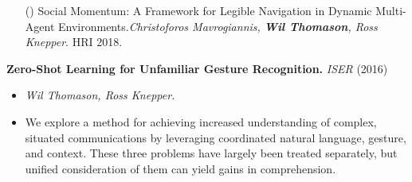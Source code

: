 \documentclass[10pt]{article}
\makeatletter
\newenvironment{innerlist}[1][\enskip\textbullet]%
{\begin{itemize}[#1,leftmargin=*,parsep=0pt,itemsep=0pt,topsep=0pt,partopsep=0pt]}
		{\end{itemize}}
\newcounter{publications}
\newcommand{\ifnonempty}[2]{\@ifnotmtarg{#1}{#2}}
\newenvironment{publication}[5][]{\addtocounter{publicationsTot}{1}\addtocounter{publications}{-1}\setlength{\parskip}{0pt}%
  \begin{itemize}[leftmargin=*,labelindent=0pt,nolistsep]%
    \setlength{\parskip}{0pt}%
  \item[(\thepublications)]{#2}.\linebreak[0]\emph{#3}. #4 #5\ifnonempty{#1}{, #1}.%
  \end{itemize}}{}
\makeatother
\begin{document}

\begin{publication}{Social Momentum: A Framework for Legible Navigation in Dynamic Multi-Agent
  Environments}{Christoforos Mavrogiannis, \textbf{Wil Thomason}, Ross Knepper}{HRI}{2018}
\end{publication}


\textbf{Zero-Shot Learning for Unfamiliar Gesture Recognition.}
\emph{ISER} (2016)
\begin{innerlist}
	\item[] \emph{Wil Thomason, Ross Knepper.}
	\item[] We explore a method for achieving increased understanding of complex, situated
	communications by leveraging coordinated natural language, gesture, and context. These three
	problems have largely been treated separately, but unified consideration of them can yield
	gains in comprehension.
\end{innerlist}\bigskip
\end{document}
